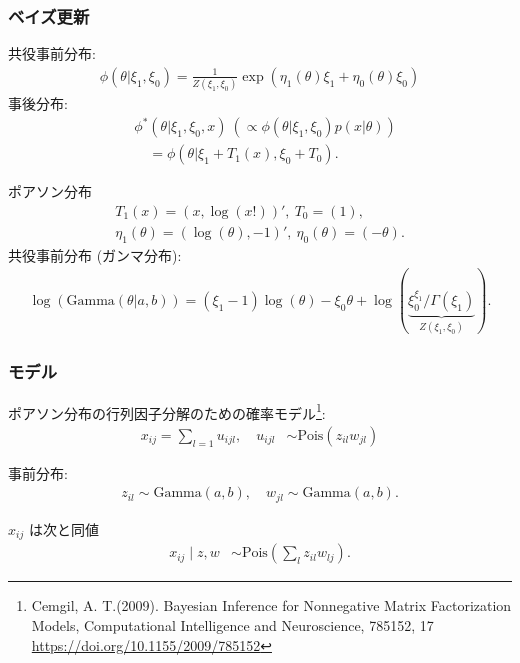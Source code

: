 \documentclass[dvipdfmx, dvipsnames]{beamer}
\begin{document}
\begin{frame}
\frametitle{ベイズ更新}
共役事前分布:
 \begin{align*}
\phi(\theta|\xi_1, \xi_0) = \frac{1}{Z(\xi_1, \xi_0)} \exp(\eta_1(\theta)\xi_1 + \eta_0(\theta)\xi_0)
\end{align*}
事後分布:
 \begin{align*}
&\phi^{\ast} (\theta|\xi_1, \xi_0, x) ~ \left(\propto \phi(\theta|\xi_1, \xi_0) p(x|\theta)\right)\\
& \quad =\phi(\theta|\xi_1+T_1(x), \xi_0+T_0).
\end{align*}

\vfill

 ポアソン分布
\begin{align*}
T_1(x) = (x, \log(x!))', ~ T_0 = (1),\\
\eta_1(\theta) = (\log(\theta), -1)', ~\eta_0(\theta)=(-\theta).
\end{align*}
共役事前分布 (ガンマ分布):
\begin{align*}
\log (\mathrm{Gamma}(\theta|a,b)) =  (\xi_1-1) \log(\theta)  - \xi_0 \theta + \log\left(  \underbrace{\xi_0^{\xi_1}/\Gamma(\xi_1)}_{Z(\xi_1, \xi_0)}\right).
\end{align*}
\end{frame}
 
 \begin{frame}
\frametitle{モデル}
ポアソン分布の行列因子分解のための確率モデル\footnote{Cemgil, A. T.(2009). Bayesian Inference for Nonnegative Matrix Factorization Models, Computational Intelligence and Neuroscience, 785152, 17 \url{https://doi.org/10.1155/2009/785152}}:
\begin{align*}
x_{ij} = \sum_{l=1}u_{ijl}, \quad u_{ijl} &\sim \mathrm{Pois} \left(z_{il}w_{jl} \right) 
\end{align*}

事前分布: 
\begin{align*}
z_{il} \sim \mathrm{Gamma}(a, b), \quad  w_{jl} \sim \mathrm{Gamma}(a, b). 
\end{align*}

\vfill

 $x_{ij}$ は次と同値
\begin{align*}
x_{ij} \mid z, w & \sim \mathrm{Pois} \left(\sum_{l}z_{il} w_{lj} \right).
\end{align*}

\end{frame}
\end{document}
